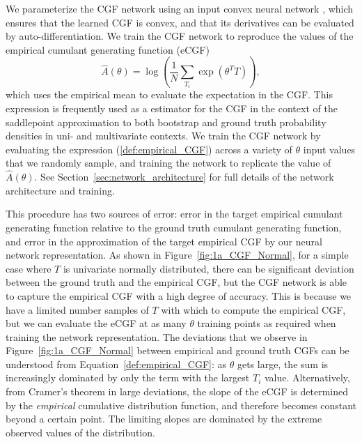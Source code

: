 \documentclass[11pt]{article}      %
\begin{document}
We parameterize the CGF network using an input convex neural network \cite{amos_input_2017,hoedt_principled_2023}, which ensures that the learned CGF is convex, and that its derivatives can be evaluated by auto-differentiation.
We train the CGF network to reproduce the values of the empirical cumulant generating function (eCGF)
\begin{equation}
  \hat A(\theta) = \log \left( \frac{1}{N}\sum_{T_i} \exp(\theta^T T) \right), \label{def:empirical_CGF}
\end{equation}
which uses the empirical mean to evaluate the expectation in the CGF. 
This expression is frequently used as a estimator for the CGF in the context of the saddlepoint approximation to both bootstrap \cite{davison_saddlepoint_1988} and ground truth \cite{ronchetti_empirical_1994} probability densities in uni- and multivariate contexts. 
We train the CGF network by evaluating the expression (\ref{def:empirical_CGF}) across a variety of $\theta$ input values that we randomly sample, and training the network to replicate the value of $\hat A(\theta)$.
See Section~\ref{sec:network_architecture} for full details of the network architecture and training.

This procedure has two sources of error: error in the target empirical cumulant generating function relative to the ground truth cumulant generating function, and error in the approximation of the target empirical CGF by our neural network representation. 
As shown in Figure~\ref{fig:1a_CGF_Normal}, for a simple case where $T$ is univariate normally distributed, there can be significant deviation between the ground truth and the empirical CGF, but the CGF network is able to capture the empirical CGF with a high degree of accuracy.
This is because we have a limited number samples of $T$ with which to compute the empirical CGF, but we can evaluate the eCGF at as many $\theta$ training points as required when training the network representation.
The deviations that we observe in Figure~\ref{fig:1a_CGF_Normal} between empirical and ground truth CGFs can be understood from Equation~\ref{def:empirical_CGF}: as $\theta$ gets large, the sum is increasingly dominated by only the term with the largest $T_i$ value.
Alternatively, from Cramer's theorem in large deviations, the slope of the eCGF is determined by the \textit{empirical} cumulative distribution function, and therefore becomes constant beyond a certain point.
The limiting slopes are dominated by the extreme observed values of the distribution.
\end{document}
